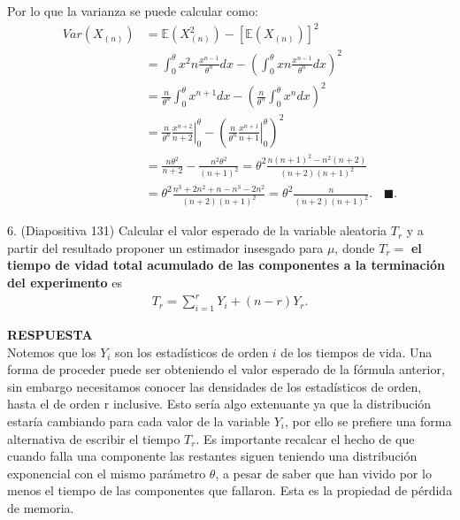 \documentclass[11pt,letterpaper]{article}
\newcommand{\mE}{\mathbb{E}}
\newcommand{\res}{\textbf{RESPUESTA}\\}
\newcommand{\finf}{\blacksquare.}
\begin{document}
Por lo que la varianza se puede calcular como:
\begin{align*}
Var(X_{(n)})&=\mE(X_{(n)}^2)-[\mE(X_{(n)})]^2\\
&=\int_0^\theta x^2 n\frac{x^{n-1}}{\theta^n} dx-\left( \int_0^\theta x n\frac{x^{n-1}}{\theta^n} dx\right)^2\\
&=\frac{n}{\theta^n}\int_0^\theta x^{n+1} dx-\left( \frac{n}{\theta^n}\int_0^\theta x^{n} dx\right)^2\\
&=\frac{n}{\theta^n}\left.\frac{x^{n+2}}{n+2}\right|_{0}^\theta -\left( \frac{n}{\theta^n}\left.\frac{x^{n+1}}{n+1}\right|_{0}^\theta \right)^2\\
&=\frac{n\theta^2}{n+2}-\frac{n^2\theta^2}{(n+1)^2}=\theta^2\frac{n(n+1)^2-n^2(n+2)}{(n+2)(n+1)^2}\\
&=\theta^2\frac{n^3+2n^2+n-n^3-2n^2}{(n+2)(n+1)^2}= \theta^2\frac{n}{(n+2)(n+1)^2}. \ \ \ \ \finf
\end{align*}

6. (Diapositiva 131) Calcular el valor esperado de la variable aleatoria $T_r$ y a partir del resultado proponer un estimador insesgado para $\mu$, donde $T_r=$ \textbf{el tiempo de vidad total acumulado de las componentes a la terminación del experimento} es
\begin{align*}
T_r=\sum_{i=1}^rY_i+(n-r)Y_r.
\end{align*}

\res Notemos que los $Y_i$ son los estadísticos de orden $i$ de los tiempos de vida. Una forma de proceder puede ser obteniendo el valor esperado de la fórmula anterior, sin embargo necesitamos conocer las densidades de los estadísticos de orden, hasta el de orden r inclusive. Esto sería algo extenuante ya que la distribución estaría cambiando para cada valor de la variable $Y_i$, por ello se prefiere una forma alternativa de escribir el tiempo $T_r$. Es importante recalcar el hecho de que cuando falla una componente las restantes siguen teniendo una distribución exponencial con el mismo parámetro $\theta$, a pesar de saber que han vivido por lo menos el tiempo de las componentes que fallaron. Esta es la propiedad de pérdida de memoria.
\end{document}
